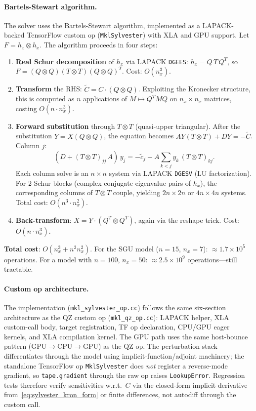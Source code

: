 \documentclass[11pt,a4paper]{article}
\theoremstyle{definition}
\newcommand{\code}[1]{\texttt{\color{codecolor}#1}}
\begin{document}
	\paragraph{Bartels-Stewart algorithm.}
	The solver uses the Bartels-Stewart algorithm, implemented as a LAPACK-backed TensorFlow custom op (\code{MklSylvester}) with XLA and GPU support.
	Let $F = h_x \otimes h_x$.  The algorithm proceeds in four steps:
	\begin{enumerate}
		\item \textbf{Real Schur decomposition} of $h_x$ via LAPACK \code{DGEES}: $h_x = Q \, T \, Q^T$, so $F = (Q \otimes Q)(T \otimes T)(Q \otimes Q)^T$.  Cost: $O(n_x^3)$.
		\item \textbf{Transform} the RHS: $\tilde{C} = C \cdot (Q \otimes Q)$.  Exploiting the Kronecker structure, this is computed as $n$ applications of $M \mapsto Q^T M Q$ on $n_x \times n_x$ matrices, costing $O(n \cdot n_x^3)$.
		\item \textbf{Forward substitution} through $T \otimes T$ (quasi-upper triangular).  After the substitution $Y = X (Q \otimes Q)$, the equation becomes $A Y (T \otimes T) + D Y = -\tilde{C}$.  Column $j$:
		\begin{equation}
			(D + (T \otimes T)_{jj} \, A) \, y_j = -\tilde{c}_j - A \sum_{k < j} y_k \, (T \otimes T)_{kj}.
		\end{equation}
		Each column solve is an $n \times n$ system via LAPACK \code{DGESV} (LU factorization).
		For 2 Schur blocks (complex conjugate eigenvalue pairs of $h_x$), the corresponding columns of $T \otimes T$ couple, yielding $2n \times 2n$ or $4n \times 4n$ systems.
		Total cost: $O(n^3 \cdot n_x^2)$.
		\item \textbf{Back-transform}: $X = Y \cdot (Q^T \otimes Q^T)$, again via the reshape trick.  Cost: $O(n \cdot n_x^3)$.
	\end{enumerate}
	\textbf{Total cost}: $O(n_x^3 + n^3 n_x^2)$.
	For the SGU model ($n = 15$, $n_x = 7$): $\approx 1.7 \times 10^5$ operations.
	For a model with $n = 100$, $n_x = 50$: $\approx 2.5 \times 10^9$ operations---still tractable.

	\paragraph{Custom op architecture.}
	The implementation (\code{mkl\_sylvester\_op.cc}) follows the same six-section architecture as the QZ custom op (\code{mkl\_qz\_op.cc}): LAPACK helper, XLA custom-call body, target registration, TF op declaration, CPU/GPU eager kernels, and XLA compilation kernel.
	The GPU path uses the same host-bounce pattern (GPU$\to$CPU$\to$GPU) as the QZ op.
	The perturbation stack differentiates through the model using implicit-function/adjoint machinery; the standalone TensorFlow op \code{MklSylvester} does \emph{not} register a reverse-mode gradient, so \code{tape.gradient} through the raw op raises \code{LookupError}.
	Regression tests therefore verify sensitivities w.r.t.\ $C$ via the closed-form implicit derivative from~\eqref{eq:sylvester_kron_form} or finite differences, not autodiff through the custom call.
\end{document}
